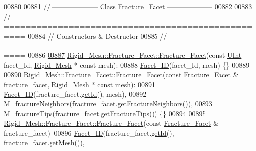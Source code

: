 \begin{DoxyCode}
00880 
00881 \textcolor{comment}{// --------------------   Class Fracture\_Facet   --------------------}
00882 
00883 \textcolor{comment}{// ==================================================}
00884 \textcolor{comment}{// Constructors & Destructor}
00885 \textcolor{comment}{// ==================================================}
00886 
\hypertarget{RigidMesh_8cpp_source.tex_l00887}{}\hyperlink{classFVCode3D_1_1Rigid__Mesh_1_1Fracture__Facet_a206a35c6464cbc525ff3c76c7051c226}{00887} \hyperlink{classFVCode3D_1_1Rigid__Mesh_1_1Fracture__Facet_a206a35c6464cbc525ff3c76c7051c226}{Rigid\_Mesh::Fracture\_Facet::Fracture\_Facet}(\textcolor{keyword}{const} 
      \hyperlink{namespaceFVCode3D_a4bf7e328c75d0fd504050d040ebe9eda}{UInt} facet\_Id, \hyperlink{classFVCode3D_1_1Rigid__Mesh}{Rigid\_Mesh} * \textcolor{keyword}{const} mesh):
00888     \hyperlink{classFVCode3D_1_1Rigid__Mesh_1_1Facet__ID}{Facet\_ID}(facet\_Id, mesh) \{\}
00889 
\hypertarget{RigidMesh_8cpp_source.tex_l00890}{}\hyperlink{classFVCode3D_1_1Rigid__Mesh_1_1Fracture__Facet_abe98490b887bd620c0704f000e4f113b}{00890} \hyperlink{classFVCode3D_1_1Rigid__Mesh_1_1Fracture__Facet_a206a35c6464cbc525ff3c76c7051c226}{Rigid\_Mesh::Fracture\_Facet::Fracture\_Facet}(\textcolor{keyword}{const} 
      \hyperlink{classFVCode3D_1_1Rigid__Mesh_1_1Fracture__Facet}{Fracture\_Facet} & fracture\_facet, \hyperlink{classFVCode3D_1_1Rigid__Mesh}{Rigid\_Mesh} * \textcolor{keyword}{const} mesh):
00891     \hyperlink{classFVCode3D_1_1Rigid__Mesh_1_1Facet__ID}{Facet\_ID}(fracture\_facet.\hyperlink{classFVCode3D_1_1Rigid__Mesh_1_1Facet__ID_acf00cdd98ae92a84d82754d0d9878b64}{getId}(), mesh),
00892     \hyperlink{classFVCode3D_1_1Rigid__Mesh_1_1Fracture__Facet_ac1812d6492dbf2b3a270cc8db789471f}{M\_fractureNeighbors}(fracture\_facet.\hyperlink{classFVCode3D_1_1Rigid__Mesh_1_1Fracture__Facet_a8938590c97aba07cb21bb9ba8d64cecd}{getFractureNeighbors}()),
00893     \hyperlink{classFVCode3D_1_1Rigid__Mesh_1_1Fracture__Facet_a7bd9c81fb6dca96265060615307b14ad}{M\_fractureTips}(fracture\_facet.\hyperlink{classFVCode3D_1_1Rigid__Mesh_1_1Fracture__Facet_ac505cd03d98e3ff67c9bf8fdc8b42689}{getFractureTips}()) \{\}
00894 
\hypertarget{RigidMesh_8cpp_source.tex_l00895}{}\hyperlink{classFVCode3D_1_1Rigid__Mesh_1_1Fracture__Facet_a9a51c22a69010cfc99cba80ac1bffa58}{00895} \hyperlink{classFVCode3D_1_1Rigid__Mesh_1_1Fracture__Facet_a206a35c6464cbc525ff3c76c7051c226}{Rigid\_Mesh::Fracture\_Facet::Fracture\_Facet}(\textcolor{keyword}{const} 
      \hyperlink{classFVCode3D_1_1Rigid__Mesh_1_1Fracture__Facet}{Fracture\_Facet} & fracture\_facet):
00896     \hyperlink{classFVCode3D_1_1Rigid__Mesh_1_1Facet__ID}{Facet\_ID}(fracture\_facet.\hyperlink{classFVCode3D_1_1Rigid__Mesh_1_1Facet__ID_acf00cdd98ae92a84d82754d0d9878b64}{getId}(), fracture\_facet.\hyperlink{classFVCode3D_1_1Rigid__Mesh_1_1Facet__ID_a7c8237fc0d6d1706deef2dcd872b4480}{getMesh}()),

\end{DoxyCode}
